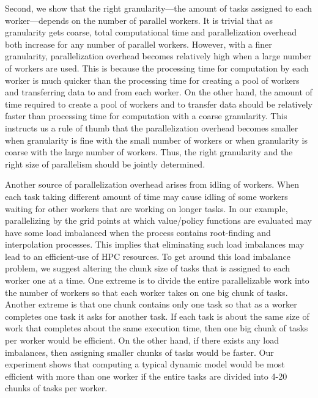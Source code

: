 \documentclass[12pt]{article}
\begin{document}
Second, we show that the right granularity---the amount of tasks assigned to each worker---depends on the number of parallel workers. It is trivial that as granularity gets coarse, total computational time and parallelization overhead both increase for any number of parallel workers. However, with a finer granularity, parallelization overhead becomes relatively high when a large number of workers are used. This is because the processing time for computation by each worker is much quicker than the processing time for creating a pool of workers and transferring data to and from each worker. On the other hand, the amount of time required to create a pool of workers and to transfer data should be relatively faster than processing time for computation with a coarse granularity. This instructs us a rule of thumb that the parallelization overhead becomes smaller when granularity is fine with the small number of workers or when granularity is coarse with the large number of workers. Thus, the right granularity and the right size of parallelism should be jointly determined.


Another source of parallelization overhead arises from idling of workers. When each task taking different amount of time may cause idling of some workers waiting for other workers that are working on longer tasks. In our example, parallelizing by the grid points at which value/policy functions are evaluated may have some load imbalanced when the process contains root-finding and interpolation processes. This implies that eliminating such load imbalances may lead to an efficient-use of HPC resources. To get around this load imbalance problem, we suggest altering the chunk size of tasks that is assigned to each worker one at a time. One extreme is to divide the entire parallelizable work into the number of workers so that each worker takes on one big chunk of tasks. Another extreme is that one chunk contains only one task so that as a worker completes one task it asks for another task. If each task is about the same size of work that completes about the same execution time, then one big chunk of tasks per worker would be efficient. On the other hand, if there exists any load imbalances, then assigning smaller chunks of tasks would be faster. Our experiment shows that computing a typical dynamic model would be most efficient with more than one worker if the entire tasks are divided into 4-20 chunks of tasks per worker.
\end{document}
